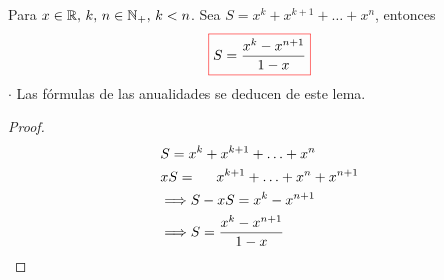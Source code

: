 \begin{lemma}
Para $x\in \mathbb R, \, k, \, n \in \mathbb N_+, \, k<n$. Sea $S= x^k + x^{k+1} + \ldots + x^n$, entonces
$$\color{red}\boxed{\color{black}S = \frac{x^k-x^{n+1}}{1-x}}$$
\color{blue} $\cdot$ Las fórmulas de las anualidades se deducen de este lema.
\end{lemma}
\color{black} \begin{proof}
\begin{align*}
& S = x^k + x^{k+1} + \ldots + x^n \\
& xS = \hspace{0.5cm} x^{k+1} + \ldots + x^n + x^{n+1} \\
& \Longrightarrow S-xS = x^k -x^{n+1} \\
& \Longrightarrow S = \frac{x^k-x^{n+1}}{1-x} 
\end{align*}
\end{proof}

